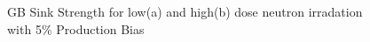 \documentclass[a4paper]{article}
\begin{document}
      \begin{figure}[h!]  %
        \centering
        \qquad
        \caption{GB Sink Strength for low(a) and high(b) dose neutron irradation with 5\% Production Bias}
        \label{figure:sink_strengths_neutron_5_1e-6}
      \end{figure}
\end{document}
